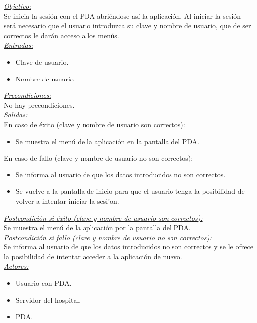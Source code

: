 \emph{\underline{Objetivo:}}\bigskip \\Se inicia la sesi\'on con el PDA abri\'endose as\'i la aplicaci\'on. Al iniciar la sesi\'on ser\'a necesario que el usuario introduzca su clave y nombre de usuario, que de ser correctos le dar\'an acceso a los men\'us.\bigskip \\ \emph{\underline{Entradas:}}
\begin{itemize}
\item Clave de usuario.
\item Nombre de usuario.
\end{itemize}
\emph{\underline{Precondiciones:}}\bigskip \\No hay precondiciones.\bigskip \\ \emph{\underline{Salidas:}}\bigskip \\En caso de \'exito (clave y nombre de usuario son correctos): 
\begin{itemize}
	\item Se muestra el men\'u de la aplicaci\'on en la pantalla del PDA.
\end{itemize}
En caso de fallo (clave y nombre de usuario no son correctos): 
\begin{itemize}
	\item Se informa al usuario de que los datos introducidos no son correctos.
	\item Se vuelve a la pantalla de inicio para que el usuario tenga la posibilidad de volver  a intentar iniciar la sesi'on.
\end{itemize}
\emph{\underline{Postcondici\'on si \'exito (clave y nombre de usuario son correctos):}}\bigskip \\Se muestra el men\'u de la aplicaci\'on por la pantalla del PDA.\bigskip \\ \emph{\underline{Postcondici\'on si fallo (clave y nombre de usuario no son correctos):}}\bigskip \\ Se informa al usuario de que los datos introducidos no son correctos y se le ofrece la posibilidad de intentar acceder a la aplicaci\'on de nuevo.\bigskip \\ \emph{\underline{Actores: }}
\begin{itemize}
	\item Usuario con PDA.
	\item Servidor del hospital.
	\item PDA.
\end{itemize}

